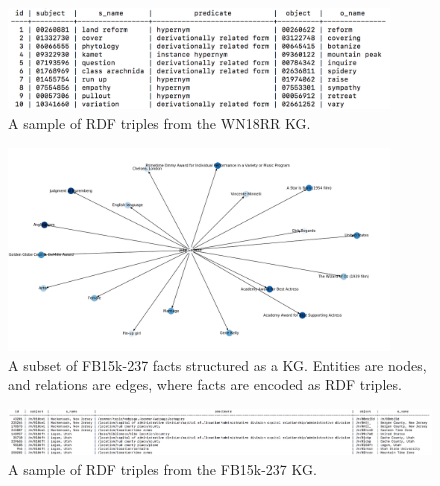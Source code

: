 \begin{figure}
   	\centering
    	\includegraphics[width=0.9\textwidth, height=0.3\textwidth]{wn18rr_fact_sample}
	\captionsetup{justification=centering}
	\caption{A sample of RDF triples from the WN18RR KG.}
\end{figure}

\begin{figure}
   	\centering
    	\includegraphics[width=0.9\textwidth, height=0.6\textwidth]{FB15k-237_Graph}
	\captionsetup{justification=centering}
	\caption{A subset of FB15k-237 facts structured as a KG. Entities are nodes, and relations are edges, where facts are encoded as RDF triples.}
\end{figure}

\begin{figure}
   	\centering
    	\includegraphics[width=1.0\textwidth, height=0.3\textwidth]{fb15k_237_fact_sample}
	\captionsetup{justification=centering}
	\caption{A sample of RDF triples from the FB15k-237 KG.}
\end{figure}

